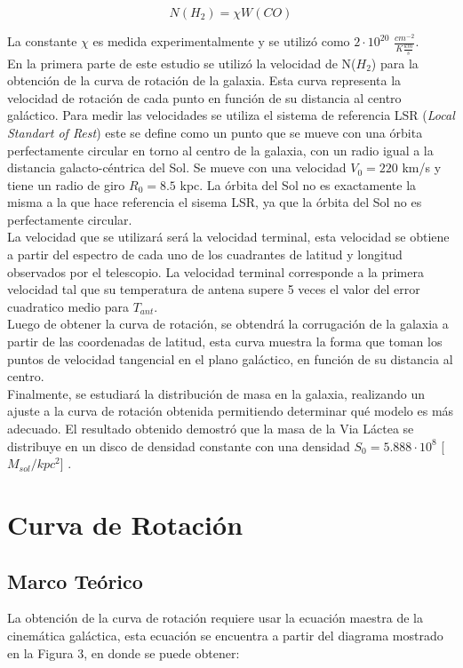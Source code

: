 \documentclass[letterpaper,oneside]{article}
\begin{document}
\begin{equation}
    N(H_2) = \chi W(CO)
\end{equation}

La constante $\chi$ es medida experimentalmente y se utilizó como $2 \cdot 10^{20}$ $\frac{cm^{-2}}{K\frac{km}{s}}$.\\

En la primera parte de este estudio se utilizó la velocidad de N($H_2$) para la obtención de la curva de rotación de la galaxia. Esta curva representa la velocidad de rotación de cada punto en función de su distancia al centro galáctico. Para medir las velocidades se utiliza el sistema de referencia LSR (\emph{Local Standart of Rest}) este se define como un punto que se mueve con una órbita perfectamente circular en torno al centro de la galaxia, con un radio igual a la distancia galacto-céntrica del Sol. Se mueve con una velocidad $V_0 = 220$ km/s y tiene un radio de giro $R_0=8.5$ kpc. La órbita del Sol no es exactamente la misma a la que hace referencia el sisema LSR, ya que la órbita del Sol no es perfectamente circular.\\

La velocidad que se utilizará será la velocidad terminal, esta velocidad se obtiene a partir del espectro de cada uno de los cuadrantes de latitud y longitud observados por el telescopio. La velocidad terminal corresponde a la primera velocidad tal que su temperatura de antena supere 5 veces el valor del error cuadratico medio para $T_{ant}$.\\

Luego de obtener la curva de rotación, se obtendrá la corrugación de la galaxia a partir de las coordenadas de latitud, esta curva muestra la forma que toman los puntos de velocidad tangencial en el plano galáctico, en función de su distancia al centro.\\

Finalmente, se estudiará la distribución de masa en la galaxia, realizando un ajuste a la curva de rotación obtenida permitiendo determinar qué modelo es más adecuado. El resultado obtenido demostró que la masa de la Via Láctea se distribuye en un disco de densidad constante con una densidad $S_0 =5.888 \cdot 10^{8}$ [$M_{sol}/kpc^{2}$] .\\

\section{Curva de Rotación}
\subsection{Marco Teórico}
La obtención de la curva de rotación requiere usar la ecuación maestra de la cinemática galáctica, esta ecuación se encuentra a partir del diagrama mostrado en la Figura 3, en donde se puede obtener:
\end{document}
